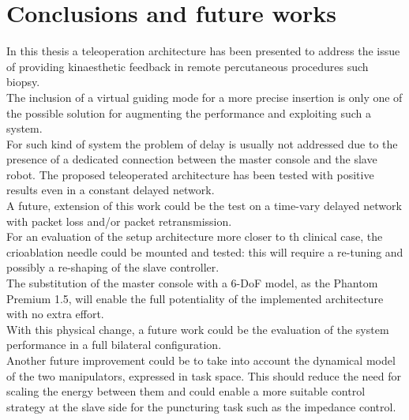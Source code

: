 \chapter*{Conclusions and future works}
In this thesis a teleoperation architecture has been presented to address the issue of providing kinaesthetic feedback in remote percutaneous procedures such biopsy.\\
The inclusion of a virtual guiding mode for a more precise insertion is only one of the possible solution for augmenting the performance and exploiting such a system.\\
For such kind of system the problem of delay is usually not addressed due to the presence of a dedicated connection between the master console  and the slave robot.
The proposed teleoperated architecture has been tested with positive results even in a constant delayed network.\\
A future, extension of this work could be the test on a time-vary delayed network with packet loss and/or packet retransmission.\\
For an evaluation of the setup architecture more closer to th clinical case, the crioablation needle could be mounted and tested: this will require a re-tuning and possibly a re-shaping of the slave controller.\\
The substitution of the master console with a 6-DoF model, as the Phantom Premium 1.5, will enable the full potentiality of the implemented architecture with no extra effort.\\
With this physical change, a future work could be the evaluation of the system performance in a full bilateral configuration.\\
Another future improvement could be to take into account the dynamical model of the two manipulators, expressed in task space. This should reduce the need for scaling the energy between them and could enable a more suitable control strategy at the slave side for the puncturing task such as the impedance control. 
 

\clearpage
\thispagestyle{empty}